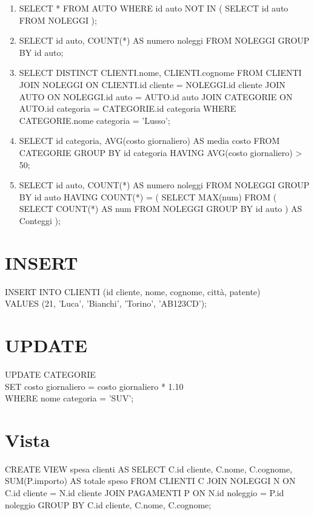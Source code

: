 \documentclass[a4paper,12pt]{article}
\begin{document}
\begin{enumerate}
		\item 
		SELECT *
		FROM AUTO
		WHERE id auto NOT IN (
		SELECT id auto
		FROM NOLEGGI
		);
		

		
		\item 
		SELECT id auto, COUNT(*) AS numero noleggi
		FROM NOLEGGI
		GROUP BY id auto;
		
		\item 
		SELECT DISTINCT CLIENTI.nome, CLIENTI.cognome
		FROM CLIENTI
		JOIN NOLEGGI ON CLIENTI.id cliente = NOLEGGI.id cliente
		JOIN AUTO ON NOLEGGI.id auto = AUTO.id auto
		JOIN CATEGORIE ON AUTO.id categoria = CATEGORIE.id categoria
		WHERE CATEGORIE.nome categoria = 'Lusso';
		
		\item 
		SELECT id categoria, AVG(costo giornaliero) AS media costo
		FROM CATEGORIE
		GROUP BY id categoria
		HAVING AVG(costo giornaliero) > 50;
		
		\item 
		SELECT id auto, COUNT(*) AS numero noleggi
		FROM NOLEGGI
		GROUP BY id auto
		HAVING COUNT(*) = (
		SELECT MAX(num)
		FROM (
		SELECT COUNT(*) AS num
		FROM NOLEGGI
		GROUP BY id auto
		) AS Conteggi
		);
		
	\end{enumerate}
	
	\section*{INSERT}
	INSERT INTO CLIENTI (id cliente, nome, cognome, città, patente) \\
	VALUES (21, 'Luca', 'Bianchi', 'Torino', 'AB123CD');
	
	\section*{UPDATE}
	UPDATE CATEGORIE \\
	SET costo giornaliero = costo giornaliero * 1.10 \\
	WHERE nome categoria = 'SUV';
	
	\section*{Vista}
	CREATE VIEW spesa clienti AS
	SELECT C.id cliente, C.nome, C.cognome, SUM(P.importo) AS totale speso
	FROM CLIENTI C
	JOIN NOLEGGI N ON C.id cliente = N.id cliente
	JOIN PAGAMENTI P ON N.id noleggio = P.id noleggio
	GROUP BY C.id cliente, C.nome, C.cognome;
	
\end{document}
